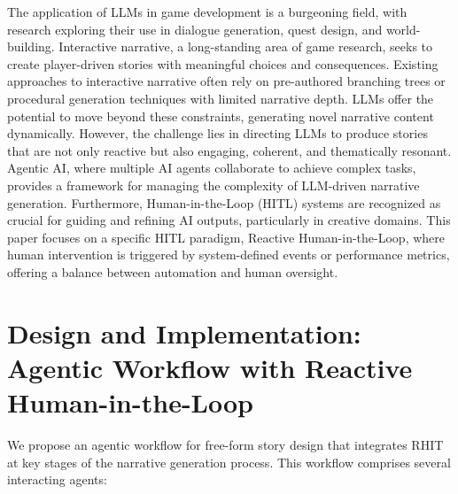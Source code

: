 \documentclass{article}
\begin{document}
The application of LLMs in game development is a burgeoning field, with research exploring their use in dialogue generation, quest design, and world-building.  Interactive narrative, a long-standing area of game research, seeks to create player-driven stories with meaningful choices and consequences.  Existing approaches to interactive narrative often rely on pre-authored branching trees or procedural generation techniques with limited narrative depth. LLMs offer the potential to move beyond these constraints, generating novel narrative content dynamically.  However, the challenge lies in directing LLMs to produce stories that are not only reactive but also engaging, coherent, and thematically resonant.  Agentic AI, where multiple AI agents collaborate to achieve complex tasks, provides a framework for managing the complexity of LLM-driven narrative generation.  Furthermore, Human-in-the-Loop (HITL) systems are recognized as crucial for guiding and refining AI outputs, particularly in creative domains.  This paper focuses on a specific HITL paradigm, Reactive Human-in-the-Loop, where human intervention is triggered by system-defined events or performance metrics, offering a balance between automation and human oversight.

\section{Design and Implementation: Agentic Workflow with Reactive Human-in-the-Loop}

We propose an agentic workflow for free-form story design that integrates RHIT at key stages of the narrative generation process.  This workflow comprises several interacting agents:
\end{document}
